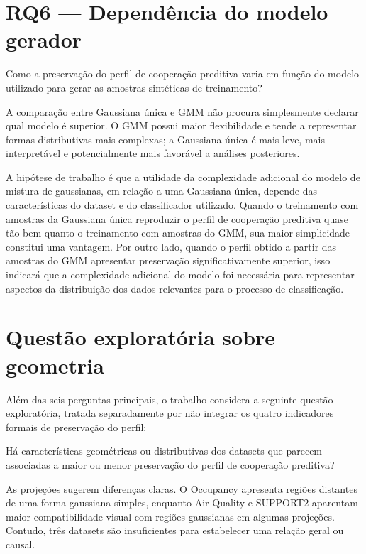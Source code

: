 \section{RQ6 --- Dependência do modelo gerador}

\begin{researchquestionbox}[RQ6]
Como a preservação do perfil de cooperação preditiva varia em função do modelo utilizado para gerar as amostras sintéticas de treinamento?
\end{researchquestionbox}

A comparação entre Gaussiana única e GMM não procura simplesmente declarar qual modelo é superior. O GMM possui maior flexibilidade e tende a representar formas distributivas mais complexas; a Gaussiana única é mais leve, mais interpretável e potencialmente mais favorável a análises posteriores.

A hipótese de trabalho é que a utilidade da complexidade adicional do modelo de mistura de gaussianas, em relação a uma Gaussiana única, depende das características do dataset e do classificador utilizado. Quando o treinamento com amostras da Gaussiana única reproduzir o perfil de cooperação preditiva quase tão bem quanto o treinamento com amostras do GMM, sua maior simplicidade constitui uma vantagem. Por outro lado, quando o perfil obtido a partir das amostras do GMM apresentar preservação significativamente superior, isso indicará que a complexidade adicional do modelo foi necessária para representar aspectos da distribuição dos dados relevantes para o processo de classificação.

\section{Questão exploratória sobre geometria}

Além das seis perguntas principais, o trabalho considera a seguinte questão exploratória, tratada separadamente por não integrar os quatro indicadores formais de preservação do perfil:

\begin{researchquestionbox}
Há características geométricas ou distributivas dos datasets que parecem associadas a maior ou menor preservação do perfil de cooperação preditiva?
\end{researchquestionbox}

As projeções sugerem diferenças claras. O Occupancy apresenta regiões distantes de uma forma gaussiana simples, enquanto Air Quality e SUPPORT2 aparentam maior compatibilidade visual com regiões gaussianas em algumas projeções. Contudo, três datasets são insuficientes para estabelecer uma relação geral ou causal.

